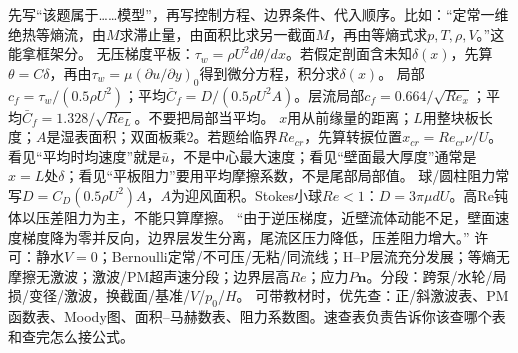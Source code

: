 先写“该题属于……模型”，再写控制方程、边界条件、代入顺序。比如：“定常一维绝热等熵流，由$M$求滞止量，由面积比求另一截面$M$，再由等熵式求$p,T,\rho,V$。”这能拿框架分。
无压梯度平板：$\tau_w=\rho U^2d\theta/dx$。若假定剖面含未知$\delta(x)$，先算$\theta=C\delta$，再由$\tau_w=\mu(\partial u/\partial y)_0$得到微分方程，积分求$\delta(x)$。
局部$c_f=\tau_w/(0.5\rho U^2)$；平均$\bar C_f=D/(0.5\rho U^2A)$。层流局部$c_f=0.664/\sqrt{Re_x}$；平均$\bar C_f=1.328/\sqrt{Re_L}$。不要把局部当平均。
$x$用从前缘量的距离；$L$用整块板长度；$A$是湿表面积；双面板乘2。若题给临界$Re_{cr}$，先算转捩位置$x_{cr}=Re_{cr}\nu/U$。
看见“平均时均速度”就是$\bar u$，不是中心最大速度；看见“壁面最大厚度”通常是$x=L$处$\delta$；看见“平板阻力”要用平均摩擦系数，不是尾部局部值。
球/圆柱阻力常写$D=C_D(0.5\rho U^2)A$，$A$为迎风面积。Stokes小球$Re<1$：$D=3\pi\mu dU$。高Re钝体以压差阻力为主，不能只算摩擦。
“由于逆压梯度，近壁流体动能不足，壁面速度梯度降为零并反向，边界层发生分离，尾流区压力降低，压差阻力增大。”
许可：静水$V=0$；Bernoulli定常/不可压/无粘/同流线；H--P层流充分发展；等熵无摩擦无激波；激波/PM超声速分段；边界层高$Re$；应力$P\bm n$。分段：跨泵/水轮/局损/变径/激波，换截面/基准/$V$/$p_0$/$H$。
可带教材时，优先查：正/斜激波表、PM函数表、Moody图、面积--马赫数表、阻力系数图。速查表负责告诉你该查哪个表和查完怎么接公式。

